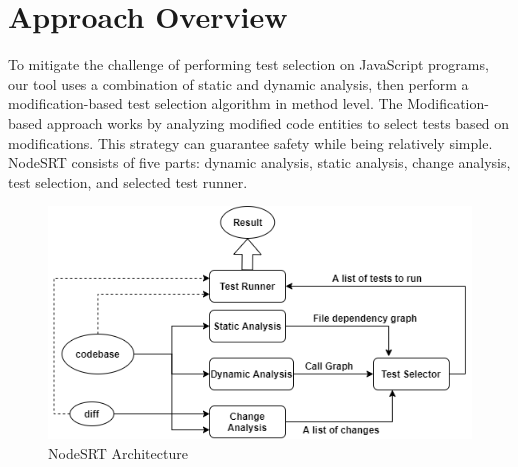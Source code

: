\documentclass[10pt, conference]{IEEEtran}
\begin{document}
\section{Approach Overview}
To mitigate the challenge of performing test selection on JavaScript programs, our tool uses a combination of static and dynamic analysis, then perform a modification-based test 
selection algorithm in method level. The Modification-based approach works by analyzing modified code entities 
to select tests based on modifications. This strategy can guarantee safety while being relatively simple. NodeSRT consists of five parts: dynamic analysis, static analysis, change analysis, 
test selection, and selected test runner. 
\begin{figure}[htbp]
    \centerline{\includegraphics[scale=0.45]{NodeSRT Architecture.png}}
    \caption{NodeSRT Architecture}
    \label{fig}
    \end{figure}    
\end{document}
